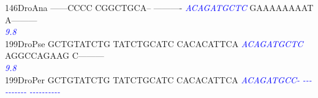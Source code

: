 \documentclass[11pt,twoside,reqno,a4paper]{article}
\begin{document}
{146\hspace*{1\charwidth}DroAna	------CCCC	CGGCTGCA--	----------	\textit{\textcolor{blue}{A}}\textit{\textcolor{blue}{C}}\textit{\textcolor{blue}{A}}\textit{\textcolor{blue}{G}}\textit{\textcolor{blue}{A}}\textit{\textcolor{blue}{T}}\textit{\textcolor{blue}{G}}\textit{\textcolor{blue}{C}}\textit{\textcolor{blue}{T}}\textit{\textcolor{blue}{C}}	GAAAAAAAAT	A---------	\\
\hspace*{4\charwidth}\hspace*{7\charwidth}\hspace*{1\charwidth}\hspace*{1\charwidth}\hspace*{1\charwidth}\hspace*{30\charwidth}\textit{\textcolor{blue}{9.8}}\hspace*{1\charwidth}\hspace*{1\charwidth}\hspace*{1\charwidth}\\
199\hspace*{1\charwidth}DroPse	GCTGTATCTG	TATCTGCATC	CACACATTCA	\textit{\textcolor{blue}{A}}\textit{\textcolor{blue}{C}}\textit{\textcolor{blue}{A}}\textit{\textcolor{blue}{G}}\textit{\textcolor{blue}{A}}\textit{\textcolor{blue}{T}}\textit{\textcolor{blue}{G}}\textit{\textcolor{blue}{C}}\textit{\textcolor{blue}{T}}\textit{\textcolor{blue}{C}}	AGGCCAGAAG	C---------	\\
\hspace*{4\charwidth}\hspace*{7\charwidth}\hspace*{1\charwidth}\hspace*{1\charwidth}\hspace*{1\charwidth}\hspace*{30\charwidth}\textit{\textcolor{blue}{9.8}}\hspace*{1\charwidth}\hspace*{1\charwidth}\hspace*{1\charwidth}\\
199\hspace*{1\charwidth}DroPer	GCTGTATCTG	TATCTGCATC	CACACATTCA	\textit{\textcolor{blue}{A}}\textit{\textcolor{blue}{C}}\textit{\textcolor{blue}{A}}\textit{\textcolor{blue}{G}}\textit{\textcolor{blue}{A}}\textit{\textcolor{blue}{T}}\textit{\textcolor{blue}{G}}\textit{\textcolor{blue}{C}}\textit{\textcolor{blue}{C}}\textit{\textcolor{blue}{-}}	\textit{\textcolor{blue}{-}}\textit{\textcolor{blue}{-}}\textit{\textcolor{blue}{-}}\textit{\textcolor{blue}{-}}\textit{\textcolor{blue}{-}}\textit{\textcolor{blue}{-}}\textit{\textcolor{blue}{-}}\textit{\textcolor{blue}{-}}\textit{\textcolor{blue}{-}}\textit{\textcolor{blue}{-}}	\textit{\textcolor{blue}{-}}\textit{\textcolor{blue}{-}}\textit{\textcolor{blue}{-}}\textit{\textcolor{blue}{-}}\textit{\textcolor{blue}{-}}\textit{\textcolor{blue}{-}}\textit{\textcolor{blue}{-}}\textit{\textcolor{blue}{-}}\textit{\textcolor{blue}{-}}\textit{\textcolor{blue}{-}}	\\
}
\end{document}
